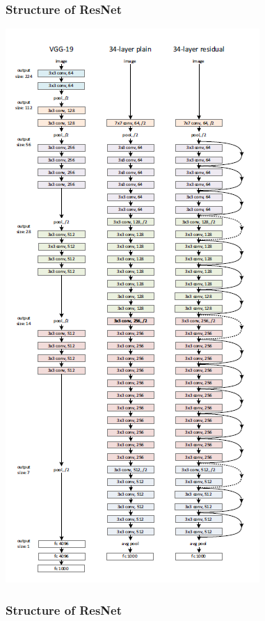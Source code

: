\begin{frame}[allowframebreaks]
	\frametitle{Structure of ResNet}
	
	\begin{center}
		\includegraphics[scale=0.5]{figs/ResNet_structure}
	\end{center}

\framebreak

\frametitle{Structure of ResNet}
\begin{columns} %
	

\end{columns}
\end{frame}
